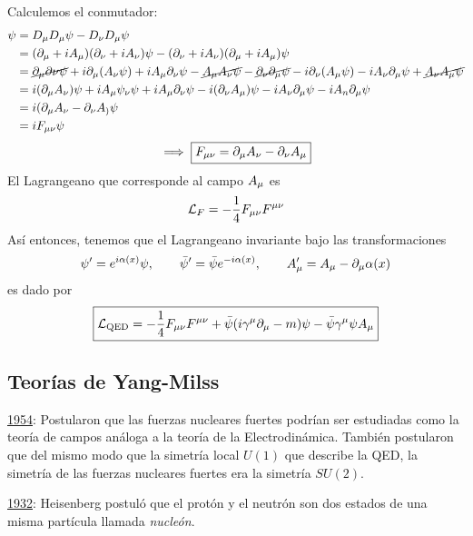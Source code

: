 Calculemos el conmutador:
\begin{align*}
  [D_\m ,D_\n ]\psi&=D_\m D_\m \psi-D_\n D_\m \psi\\
  &=(\partial_\m +iA_\m )(\partial_\n  +iA_\n  )\psi -(\partial_\n  +iA_\n  )(\partial_\m +iA_\m )\psi\\
  &=\cancel{\partial_\m \partial\n \psi}+i\partial_\m (A_\n \psi)+iA_\m \partial_\n \psi-\cancel{A_\m A_\n \psi}-\cancel{\partial_\n \partial_\m \psi}-i\partial_\n (A_\m \psi)-iA_\n \partial_\m \psi+\cancel{A_\n A_\m \psi}\\
  &=i(\partial_\m A_\n )\psi+iA_\m \psi_\n \psi+iA_\m \partial_\n \psi-i(\partial_\n A_\m )\psi-iA_\n \partial_\m \psi-iA_n\partial_\m \psi\\
  &=i(\partial_\m A_\n -\partial_\n A_\mathcal)\psi\\
  &=iF_{\m\n }\psi
\end{align*}
\begin{equation}
  \implies \boxed{F_{\mu\nu}=\partial_\mu A_\nu -\partial_\nu A_\mu }
\end{equation}
El Lagrangeano que corresponde al campo $A_\mu $ es
\begin{equation}
  \mathcal{L}_F=-\frac{1}{4}F_{\mu\nu}F^{\mu\nu }
\end{equation}
Así entonces, tenemos que el Lagrangeano invariante bajo las transformaciones
\begin{equation}
  \psi'=e^{i\alpha (x)}\psi,\qquad \bar{\psi}'=\bar{\psi}e^{-i\alpha (x)},\qquad A_\mu'=A_\mu -\partial_\mu \alpha(x)
\end{equation}
es dado por
\begin{equation}
 \boxed{ \mathcal{L}_{\rm QED}=-\frac{1}{4}F_{\mu\nu }F^{\mu\nu }+\bar{\psi}(i\gamma^\mu \partial_\mu -m)\psi-\bar{\psi}\gamma^\mu \psi A_\mu }
\end{equation}

\subsection{Teorías de Yang-Milss}
\underline{1954}: Postularon que las fuerzas nucleares fuertes podrían ser estudiadas como la teoría de campos análoga a la teoría de la Electrodinámica. También postularon que del mismo modo que la simetría local $U(1)$ que describe la QED, la simetría de las fuerzas nucleares fuertes era la simetría $SU(2)$.

\underline{1932}: Heisenberg postuló que el protón y el neutrón son dos estados de una misma partícula llamada \textit{nucleón}.

